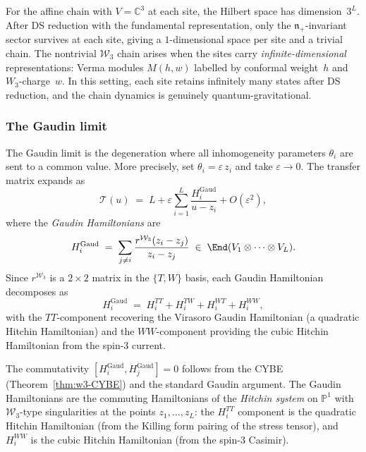\begin{remark}%
\label{rem:state-counting}%
%
For the affine chain with $V = \mathbb{C}^3$ at each site,
the Hilbert space has dimension~$3^L$. After DS reduction
with the fundamental representation, only the
$\mathfrak{n}_+$-invariant sector survives at each site,
giving a $1$-dimensional space per site and a trivial chain.
The nontrivial $\mathcal{W}_3$ chain arises when the sites
carry \emph{infinite-dimensional} representations: Verma
modules $M(h, w)$ labelled by conformal weight~$h$ and
$W_3$-charge~$w$. In this setting, each site retains
infinitely many states after DS reduction, and the chain
dynamics is genuinely quantum-gravitational.
\end{remark}

\subsubsection{The Gaudin limit}

\begin{construction}
\label{constr:w3-gaudin}
%
%
The Gaudin limit is the degeneration where all
inhomogeneity parameters $\theta_i$ are sent to a common
value. More precisely, set $\theta_i = \varepsilon\, z_i$
and take $\varepsilon \to 0$. The transfer matrix expands as
\[
\mathcal{T}(u)
\;=\;
L + \varepsilon \sum_{i=1}^{L} \frac{H_i^{\mathrm{Gaud}}}{u - z_i}
+ O(\varepsilon^2),
\]
where the \emph{Gaudin Hamiltonians} are
\begin{equation}
\label{eq:w3-gaudin-hamiltonians}
H_i^{\mathrm{Gaud}}
\;=\;
\sum_{j \ne i}
\frac{r^{\mathcal{W}_3}(z_i - z_j)}{z_i - z_j}
\;\in\;
\End(V_1 \otimes \cdots \otimes V_L).
\end{equation}
Since $r^{\mathcal{W}_3}$ is a $2 \times 2$ matrix in the
$\{T, W\}$ basis, each Gaudin Hamiltonian decomposes as
\begin{equation}
\label{eq:w3-gaudin-decomposition}
H_i^{\mathrm{Gaud}}
\;=\;
H_i^{TT} + H_i^{TW} + H_i^{WT} + H_i^{WW},
\end{equation}
with the $TT$-component recovering the Virasoro Gaudin
Hamiltonian (a quadratic Hitchin Hamiltonian) and the
$WW$-component providing the cubic Hitchin Hamiltonian
from the spin-$3$ current.

The commutativity $[H_i^{\mathrm{Gaud}}, H_j^{\mathrm{Gaud}}] = 0$
follows from the CYBE (Theorem~\ref{thm:w3-CYBE}) and the
standard Gaudin argument. The Gaudin Hamiltonians are
the commuting Hamiltonians of the \emph{Hitchin system}
on $\mathbb{P}^1$ with $\mathcal{W}_3$-type singularities
at the points $z_1, \ldots, z_L$: the $H_i^{TT}$ component
is the quadratic Hitchin Hamiltonian (from the Killing form
pairing of the stress tensor), and $H_i^{WW}$ is the
cubic Hitchin Hamiltonian (from the spin-$3$ Casimir).
\end{construction}

